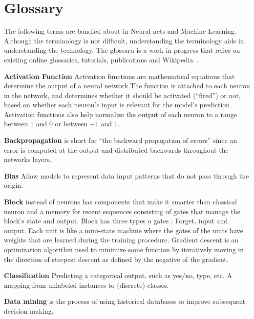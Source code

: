 

\section{Glossary}

The following terms are bandied about in Neural nets and Machine Learning. Although the terminology is not difficult, understanding the terminology aids in understanding the technology. The glossaru is a work-in-progress that relies on existing online glossaries, tutorials, publications and Wikipedia~\cite{stanfordGlossary,provost1998glossary,ma2014machine,carroll2013grossman,minka2005statistical}.


\begin{description}
\item{\textbf{Activation Function}} Activation functions are mathematical equations that determine the output of a neural network.The function is attached to each neuron in the network, and determines whether it should be activated (``fired'') or not, 
based on whether each neuron's input is relevant for the model's prediction. 
Activation functions also help normalize the output of each neuron to a range between $1$ and $0$ or between $-1$ and $1$.

\item{\textbf{Backpropagation}}   is short for ``the backward propagation of errors'' since an error is computed at the output and distributed backwards throughout the networks layers.
\item{\textbf{Bias}} Allow models to represent data input patterns that do not pass through the origin.
\item{\textbf{Block}} instead of neurons has components that make it smarter than classical neuron and a memory for recent sequences consisting of gates that manage the block's state and output.   Block has three types o gates : Forget, input and output.  Each unit is like a mini-state machine where the gates of the units have weights that are learned during the training procedure.
Gradient descent is an optimization algorithm used to minimize some function by iteratively moving in the direction of steepest descent as defined by the negative of the gradient.



\item{\textbf{Classification}} Predicting a categorical output, such as yes/no, type, etc. A mapping from unlabeled instances to (discrete) classes.

\item{\textbf{Data mining}} is the process of using historical databases to improve subsequent decision making. 


\end{description}
